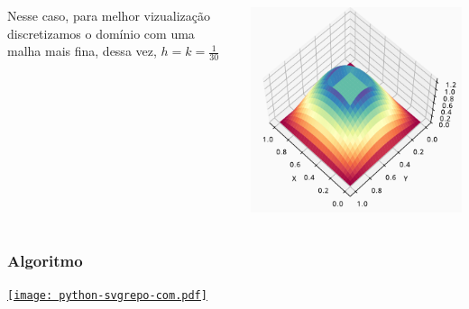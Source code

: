\documentclass[xcolor=dvipsnames, aspectratio=169]{beamer}
\begin{document}
    \begin{frame}
        \begin{columns}
            \begin{column}{0.4\textwidth}
                Nesse caso, para melhor vizualização discretizamos o domínio com uma malha mais fina, dessa vez, $h = k = \frac{1}{30}$
            \end{column}
            \begin{column}{0.6\textwidth}
                \begin{center}
                    \includegraphics[width=\columnwidth]{../../difusão_barreira.pdf}
                \end{center}
            \end{column}
        \end{columns}
    \end{frame}
    \begin{frame}
        \frametitle{Algoritmo}
        \begin{center}
            \href{https://colab.research.google.com/drive/1Y1kNWiiygloHG2eUsq1QT8r1A1eB4Pjj?usp=sharing}{\texttt{[image: python-svgrepo-com.pdf]}}
        \end{center}
    \end{frame}
    \begin{frame}
        \nocite{*}
        \printbibliography
    \end{frame}
\end{document}
